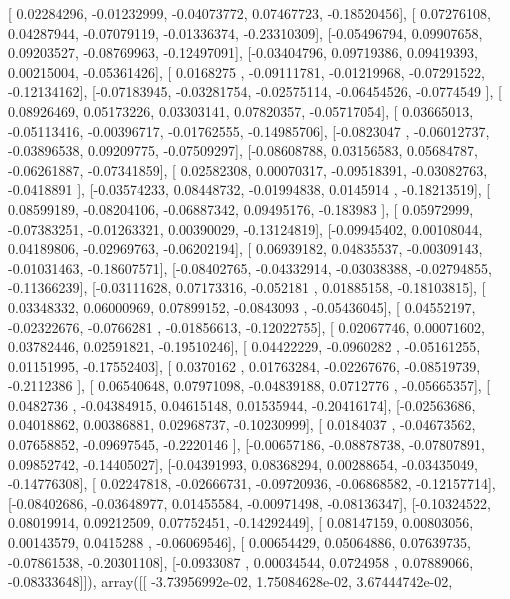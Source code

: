 \documentclass{article}
\begin{document}
       [ 0.02284296, -0.01232999, -0.04073772,  0.07467723, -0.18520456],
       [ 0.07276108,  0.04287944, -0.07079119, -0.01336374, -0.23310309],
       [-0.05496794,  0.09907658,  0.09203527, -0.08769963, -0.12497091],
       [-0.03404796,  0.09719386,  0.09419393,  0.00215004, -0.05361426],
       [ 0.0168275 , -0.09111781, -0.01219968, -0.07291522, -0.12134162],
       [-0.07183945, -0.03281754, -0.02575114, -0.06454526, -0.0774549 ],
       [ 0.08926469,  0.05173226,  0.03303141,  0.07820357, -0.05717054],
       [ 0.03665013, -0.05113416, -0.00396717, -0.01762555, -0.14985706],
       [-0.0823047 , -0.06012737, -0.03896538,  0.09209775, -0.07509297],
       [-0.08608788,  0.03156583,  0.05684787, -0.06261887, -0.07341859],
       [ 0.02582308,  0.00070317, -0.09518391, -0.03082763, -0.0418891 ],
       [-0.03574233,  0.08448732, -0.01994838,  0.0145914 , -0.18213519],
       [ 0.08599189, -0.08204106, -0.06887342,  0.09495176, -0.183983  ],
       [ 0.05972999, -0.07383251, -0.01263321,  0.00390029, -0.13124819],
       [-0.09945402,  0.00108044,  0.04189806, -0.02969763, -0.06202194],
       [ 0.06939182,  0.04835537, -0.00309143, -0.01031463, -0.18607571],
       [-0.08402765, -0.04332914, -0.03038388, -0.02794855, -0.11366239],
       [-0.03111628,  0.07173316, -0.052181  ,  0.01885158, -0.18103815],
       [ 0.03348332,  0.06000969,  0.07899152, -0.0843093 , -0.05436045],
       [ 0.04552197, -0.02322676, -0.0766281 , -0.01856613, -0.12022755],
       [ 0.02067746,  0.00071602,  0.03782446,  0.02591821, -0.19510246],
       [ 0.04422229, -0.0960282 , -0.05161255,  0.01151995, -0.17552403],
       [ 0.0370162 ,  0.01763284, -0.02267676, -0.08519739, -0.2112386 ],
       [ 0.06540648,  0.07971098, -0.04839188,  0.0712776 , -0.05665357],
       [ 0.0482736 , -0.04384915,  0.04615148,  0.01535944, -0.20416174],
       [-0.02563686,  0.04018862,  0.00386881,  0.02968737, -0.10230999],
       [ 0.0184037 , -0.04673562,  0.07658852, -0.09697545, -0.2220146 ],
       [-0.00657186, -0.08878738, -0.07807891,  0.09852742, -0.14405027],
       [-0.04391993,  0.08368294,  0.00288654, -0.03435049, -0.14776308],
       [ 0.02247818, -0.02666731, -0.09720936, -0.06868582, -0.12157714],
       [-0.08402686, -0.03648977,  0.01455584, -0.00971498, -0.08136347],
       [-0.10324522,  0.08019914,  0.09212509,  0.07752451, -0.14292449],
       [ 0.08147159,  0.00803056,  0.00143579,  0.0415288 , -0.06069546],
       [ 0.00654429,  0.05064886,  0.07639735, -0.07861538, -0.20301108],
       [-0.0933087 ,  0.00034544,  0.0724958 ,  0.07889066, -0.08333648]]), array([[ -3.73956992e-02,   1.75084628e-02,   3.67444742e-02,
\end{document}
